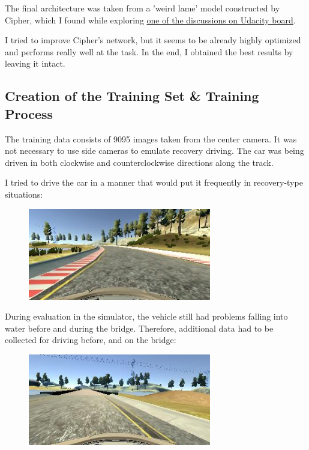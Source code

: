 \documentclass[a4paper,10pt]{article}
\begin{document}
The final architecture was taken from a 'weird lame' model constructed by Cipher,
which I found while exploring \href{https://discussions.udacity.com/t/steering-stuck-hard-right/226720/24}{one of the discussions on Udacity board}.

I tried to improve Cipher's network, but it seems to be already highly optimized and performs really well at the task.
In the end, I obtained the best results by leaving it intact.

\subsection{Creation of the Training Set \& Training Process}\label{CTT}

The training data consists of 9095 images taken from the center camera.
It was not necessary to use side cameras to emulate recovery driving.
The car was being driven in both clockwise and counterclockwise directions along the track.

I tried to drive the car in a manner that would put it frequently in recovery-type situations:

\begin{figure}[h]
  \begin{center}
  \includegraphics[width=80mm]{recovery.jpg}
\end{center}
\end{figure}

During evaluation in the simulator, the vehicle still had problems falling into water before and during the bridge. Therefore, additional data had to be collected for driving
before, and on the bridge:

\begin{figure}[h]
  \begin{center}
\includegraphics[width=80mm]{bridge.jpg}
\end{center}
\end{figure}
\end{document}
